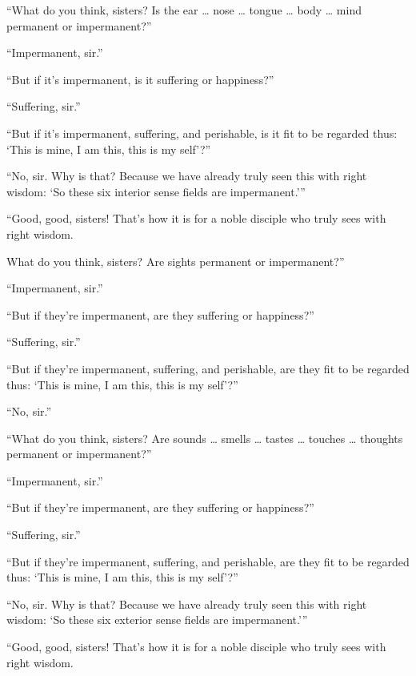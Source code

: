 \documentclass[12pt,openany]{book}%
\begin{document}
“What do you think, sisters? Is the ear … nose … tongue … body … mind permanent or impermanent?” 

“Impermanent, sir.” 

“But if it’s impermanent, is it suffering or happiness?” 

“Suffering, sir.” 

“But if it’s impermanent, suffering, and perishable, is it fit to be regarded thus: ‘This is mine, I am this, this is my self’?” 

“No, sir. Why is that? Because we have already truly seen this with right wisdom: ‘So these six interior sense fields are impermanent.’” 

“Good, good, sisters! That’s how it is for a noble disciple who truly sees with right wisdom. 

What do you think, sisters? Are sights permanent or impermanent?” 

“Impermanent, sir.” 

“But if they're impermanent, are they suffering or happiness?” 

“Suffering, sir.” 

“But if they're impermanent, suffering, and perishable, are they fit to be regarded thus: ‘This is mine, I am this, this is my self’?” 

“No, sir.” 

“What do you think, sisters? Are sounds … smells … tastes … touches … thoughts permanent or impermanent?” 

“Impermanent, sir.” 

“But if they're impermanent, are they suffering or happiness?” 

“Suffering, sir.” 

“But if they're impermanent, suffering, and perishable, are they fit to be regarded thus: ‘This is mine, I am this, this is my self’?” 

“No, sir. Why is that? Because we have already truly seen this with right wisdom: ‘So these six exterior sense fields are impermanent.’” 

“Good, good, sisters! That’s how it is for a noble disciple who truly sees with right wisdom. 
\end{document}
